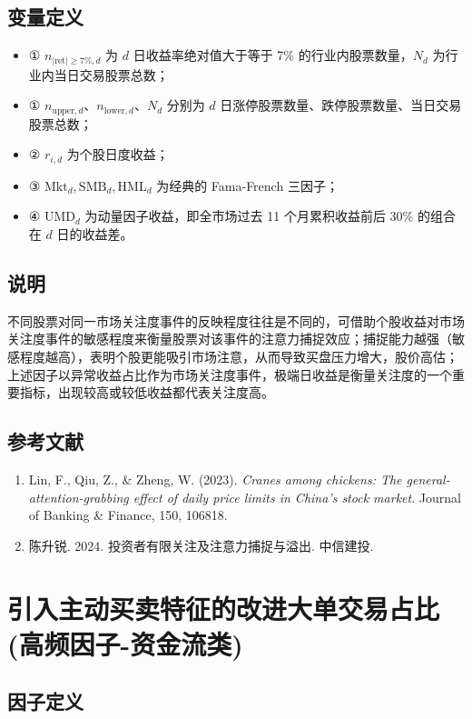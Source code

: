 \documentclass{article}
\begin{document}
\subsection{变量定义}
\begin{itemize}
    \item ① \( n_{|\mathrm{ret}| \geq 7\%, d} \) 为 \( d \) 日收益率绝对值大于等于 7\% 的行业内股票数量，\( N_d \) 为行业内当日交易股票总数；
    \item ① \(n_{\mathrm{upper},d}\)、\(n_{\mathrm{lower},d}\)、\(N_d\) 分别为 \(d\) 日涨停股票数量、跌停股票数量、当日交易股票总数；
    \item ② \( r_{i,d} \) 为个股日度收益；
    \item ③ \( \mathrm{Mkt}_d, \mathrm{SMB}_d, \mathrm{HML}_d \) 为经典的 Fama-French 三因子；
    \item ④ \( \mathrm{UMD}_d \) 为动量因子收益，即全市场过去 11 个月累积收益前后 30\% 的组合在 \( d \) 日的收益差。
\end{itemize}

\subsection{说明}
不同股票对同一市场关注度事件的反映程度往往是不同的，可借助个股收益对市场关注度事件的敏感程度来衡量股票对该事件的注意力捕捉效应；捕捉能力越强（敏感程度越高），表明个股更能吸引市场注意，从而导致买盘压力增大，股价高估；上述因子以异常收益占比作为市场关注度事件，极端日收益是衡量关注度的一个重要指标，出现较高或较低收益都代表关注度高。

\subsection{参考文献}
\begin{enumerate}
    \item Lin, F., Qiu, Z., \& Zheng, W. (2023). \textit{Cranes among chickens: The general-attention-grabbing effect of daily price limits in China's stock market}. Journal of Banking \& Finance, 150, 106818.
    \item 陈升锐. 2024. 投资者有限关注及注意力捕捉与溢出. 中信建投.
\end{enumerate}

\section{引入主动买卖特征的改进大单交易占比(高频因子-资金流类)}

\subsection{因子定义}
\end{document}
